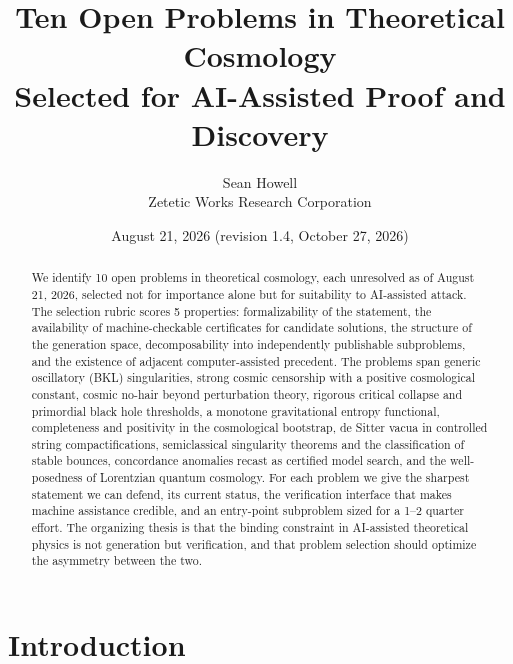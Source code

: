 \documentclass[11pt,letterpaper]{article}
\title{\bfseries Ten Open Problems in Theoretical Cosmology\\ Selected for AI-Assisted Proof and Discovery}
\author{Sean Howell\\[2pt] \normalsize Zetetic Works Research Corporation}
\date{August 21, 2026 (revision 1.4, October 27, 2026)}
\begin{document}
\maketitle

\begin{abstract}
\noindent
We identify 10 open problems in theoretical cosmology, each unresolved as of August 21, 2026, selected not for importance alone but for suitability to AI-assisted attack. The selection rubric scores 5 properties: formalizability of the statement, the availability of machine-checkable certificates for candidate solutions, the structure of the generation space, decomposability into independently publishable subproblems, and the existence of adjacent computer-assisted precedent. The problems span generic oscillatory (BKL) singularities, strong cosmic censorship with a positive cosmological constant, cosmic no-hair beyond perturbation theory, rigorous critical collapse and primordial black hole thresholds, a monotone gravitational entropy functional, completeness and positivity in the cosmological bootstrap, de Sitter vacua in controlled string compactifications, semiclassical singularity theorems and the classification of stable bounces, concordance anomalies recast as certified model search, and the well-posedness of Lorentzian quantum cosmology. For each problem we give the sharpest statement we can defend, its current status, the verification interface that makes machine assistance credible, and an entry-point subproblem sized for a 1--2 quarter effort. The organizing thesis is that the binding constraint in AI-assisted theoretical physics is not generation but verification, and that problem selection should optimize the asymmetry between the two.
\end{abstract}

\section{Introduction}
\label{sec:intro}
\end{document}
